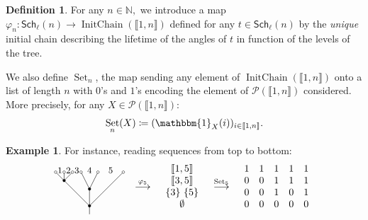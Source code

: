 \documentclass[a4paper,10pt]{amsart}
\DeclareMathOperator{\IC}{InitChain}
\DeclareMathOperator{\Set}{Set}
\newcommand\Schl{\mathsf{Sch}_\ell}
\newcommand\NN{\mathbb{N}}
\newcommand{\IEM}[2]{\llbracket #1,#2 \rrbracket}
\theoremstyle{definition}
\newtheorem{exam}{Example}
\newtheorem{defi}{Definition}
\begin{document}
\begin{defi}\label{defi:lifetime}
	For any $n\in\NN,$ we introduce a map $\varphi_n: \Schl(n)\rightarrow \IC(\IEM{1}{n})$ defined for any $t\in\Schl(n)$ by the \emph{unique} initial chain describing the lifetime of the angles of $t$ in function of the levels of the tree.
	
	We also define $\Set_n$, the map sending any element of $\IC(\IEM{1}{n})$ onto a list of length $n$ with $0$'s and $1$'s encoding the element of $\mathcal{P}(\IEM{1}{n})$ considered. More precisely, for any ${X\in\mathcal{P}(\IEM{1}{n})}$:
	\[
	\Set_n(X)\coloneq (\mathbbm{1}_X(i))_{i\in\IEM{1}{n}}.
	\]
\end{defi}
\begin{exam}\label{Eg:tree_code}
	For instance, reading sequences from top to bottom:
	\begin{align}
		\raisebox{-0.5\height}{\begin{tikzpicture}[x=0.3cm, y=0.3cm]
				\draw (0,0)--(0,1);
				\draw (0,1)--(-4,5);
				\draw (0,1)--(4,5);
				\draw (0,1)--(0,3);
				\draw (0,3)--(-1,5);
				\draw (0,3)--(1,5);
				\draw (-3,4)--(-2,5);
				\draw (-3,4)--(-3,5);
				\filldraw (0,1) circle (0.15);
				\draw[ color=black, fill=white]  (-4,5) circle (0.15);
				\draw[ color=black, fill=white]  (-3,5) circle (0.15);
				\draw[ color=black, fill=white]  (-2,5) circle (0.15);
				\draw[ color=black, fill=white]  (-1,5) circle (0.15);
				\draw[ color=black, fill=white]  (4,5) circle (0.15);
				\draw[ color=black, fill=white]  (1,5) circle (0.15);
				\filldraw (-3,4) circle (0.15);
				\filldraw (0,3) circle (0.15);		
				\draw (-3.5, 5.2) node{\small{$1$}};
				\draw (-2.5, 5.2) node{\small{$2$}};
				\draw (-1.5,5.2) node{\small{$3$}};
				\draw (0, 5.2) node{\small{$4$}};
				\draw (2.5, 5.2) node{\small{$5$}};
		\end{tikzpicture}} && \overset{\varphi_5}{\longrightarrow} && \begin{array}{c}
			\IEM{1}{5} \\
			\IEM{3}{5} \\
			\{3\}~\{5\} \\
			\emptyset
		\end{array}
		&& \overset{\Set_5}{\longrightarrow} &&  \begin{array}{ccccc}
			1 & 1 & 1 & 1 & 1 \\
			0 & 0 & 1 & 1 & 1 \\
			0 & 0 & 1 & 0 & 1 \\
			0 & 0 & 0 & 0 & 0
		\end{array} 
	\end{align}
\end{exam}
\end{document}
